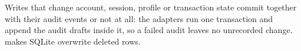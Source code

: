Writes that change account, session, profile or transaction state commit together with their audit events or not
at all: the  adapters run one  transaction and append the audit drafts inside it, so a
failed audit leaves no unrecorded change.  makes SQLite overwrite deleted rows.
